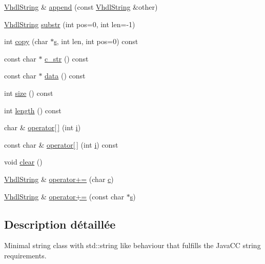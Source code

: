 \begin{DoxyCompactItemize}
\item 
\hyperlink{class_vhdl_string}{Vhdl\+String} \& \hyperlink{class_vhdl_string_a1f11b119dfb6f63b4b77a6d272b6c0d3}{append} (const \hyperlink{class_vhdl_string}{Vhdl\+String} \&other)
\item 
\hyperlink{class_vhdl_string}{Vhdl\+String} \hyperlink{class_vhdl_string_ab19c70bd559db2d839ad189dba7d4308}{substr} (int pos=0, int len=-\/1)
\item 
int \hyperlink{class_vhdl_string_a535d1815abd7fcd1a292230c2457b043}{copy} (char $\ast$\hyperlink{060__command__switch_8tcl_a011c73f2dbb87635a3b4206c72355f6e}{s}, int len, int pos=0) const 
\item 
const char $\ast$ \hyperlink{class_vhdl_string_a7d6d779af6c5e59510c4b08901138f7b}{c\+\_\+str} () const 
\item 
const char $\ast$ \hyperlink{class_vhdl_string_a3a8d3aa7794f9a63cf855915eef029c5}{data} () const 
\item 
int \hyperlink{class_vhdl_string_a145a2564c0030411267a2ceda23148a7}{size} () const 
\item 
int \hyperlink{class_vhdl_string_a987fd03c027bda8fd8538c090014a8ec}{length} () const 
\item 
char \& \hyperlink{class_vhdl_string_ab395ac8365ea53886555cb1726262d38}{operator\mbox{[}$\,$\mbox{]}} (int \hyperlink{060__command__switch_8tcl_a8c90afd4641b25be86bd09983c3cbee0}{i})
\item 
const char \& \hyperlink{class_vhdl_string_ab0f39d33f771e91c290f8570fe4384bc}{operator\mbox{[}$\,$\mbox{]}} (int \hyperlink{060__command__switch_8tcl_a8c90afd4641b25be86bd09983c3cbee0}{i}) const 
\item 
void \hyperlink{class_vhdl_string_a5deab91a4101cbd3fe7a08970b673697}{clear} ()
\item 
\hyperlink{class_vhdl_string}{Vhdl\+String} \& \hyperlink{class_vhdl_string_accbd0109902958307ae5a7f852a01289}{operator+=} (char \hyperlink{060__command__switch_8tcl_ab14f56bc3bd7680490ece4ad7815465f}{c})
\item 
\hyperlink{class_vhdl_string}{Vhdl\+String} \& \hyperlink{class_vhdl_string_a6b3ffe71a23d70e319ec82b817f32181}{operator+=} (const char $\ast$\hyperlink{060__command__switch_8tcl_a011c73f2dbb87635a3b4206c72355f6e}{s})
\end{DoxyCompactItemize}


\subsection{Description détaillée}
Minimal string class with std\+::string like behaviour that fulfills the Java\+C\+C string requirements. 

